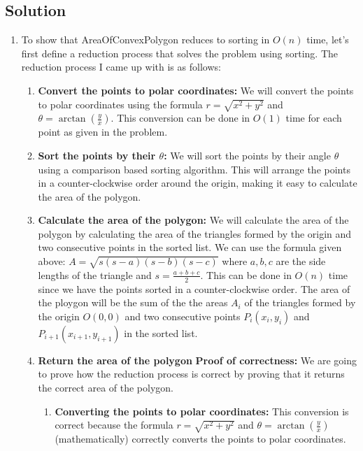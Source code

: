 \documentclass[11pt]{article}
\begin{document}
\begin{enumerate}
\section*{Solution}
\begin{enumerate}
    \item To show that AreaOfConvexPolygon reduces to sorting in $O(n)$ time, let's first define a reduction process that solves the problem using sorting. The reduction process I came up with is as follows:
    \begin{enumerate}
        \item \textbf{Convert the points to polar coordinates:} We will convert the points to polar coordinates using the formula $r=\sqrt{x^2+y^2}$ and $\theta = \arctan(\frac{y}{x})$. This conversion can be done in $O(1)$ time for each point as given in the problem. 
        \item \textbf{Sort the points by their $\theta$:} We will sort the points by their angle $\theta$ using a comparison based sorting algorithm. This will arrange the points in a counter-clockwise order around the origin, making it easy to calculate the area of the polygon.
        \item \textbf{Calculate the area of the polygon:} We will calculate the area of the polygon by calculating the area of the triangles formed by the origin and two consecutive points in the sorted list. We can use the formula given above: $A = \sqrt{s(s-a)(s-b)(s-c)}$ where $a, b, c$ are the side lengths of the triangle and $s = \frac{a + b + c}{2}$. This can be done in $O(n)$ time since we have the points sorted in a counter-clockwise order. 
        \newline
        The area of the ploygon will be the sum of the the areas $A_i$ of the triangles formed by the origin $O(0,0)$ and two consecutive points $P_i(x_i,y_i)$ and $P_{i+1}(x_{i+1},y_{i+1})$ in the sorted list.
        \item \textbf{Return the area of the polygon}
        \newline
        \textbf{Proof of correctness:} 
        \newline
        \newline
        We are going to prove how the reduction process is correct by proving that it returns the correct area of the polygon. 
        \begin{enumerate}
            \item \textbf{Converting the points to polar coordinates:} This conversion is correct because the formula $r=\sqrt{x^2+y^2}$ and $\theta = \arctan(\frac{y}{x}) $(mathematically) correctly converts the points to polar coordinates.

\end{enumerate}
\end{enumerate}
\end{enumerate}
\end{enumerate}
\end{document}
